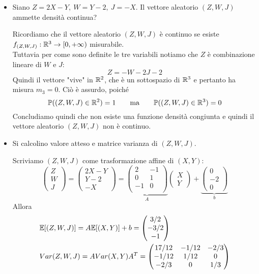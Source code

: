 \begin{itemize}
\item [(d)] Siano $Z=2X-Y,\ W=Y-2,\ J=-X$. Il vettore aleatorio $(Z,W,J)$ ammette densità continua?

Ricordiamo che il vettore aleatorio $(Z,W,J)$ è continuo se esiste $f_{(Z,W,J)}:\mathbb{R}^3\to[0,+\infty)$ misurabile. \\
Tuttavia per come sono definite le tre variabili notiamo che $Z$ è combinazione lineare di $W$ e $J$:
\[
Z=-W-2J-2
\]
Quindi il vettore "vive" in $\mathbb{R}^2$, che è un sottospazio di $\mathbb{R}^3$ e pertanto ha misura $m_3=0$. Ciò è assurdo, poiché
\[
\mathbb{P}((Z,W,J)\in\mathbb{R}^2)=1\qquad\text{ma}\qquad\mathbb{P}((Z,W,J)\in\mathbb{R}^3)=0
\]
Concludiamo quindi che non esiste una funzione densità congiunta e quindi il vettore aleatorio $(Z,W,J)$ non è continuo.

\item [(e)] Si calcolino valore atteso e matrice varianza di $(Z,W,J)$.

Scriviamo $(Z,W,J)$ come trasformazione affine di $(X,Y)$:
\[
\begin{pmatrix}
Z \\
W \\ J
\end{pmatrix}=
\begin{pmatrix}
2X-Y \\Y-2
 \\-X
\end{pmatrix} =\underbrace{\begin{pmatrix}
2 & -1 \\
 0&1  \\
 -1&0  \\
\end{pmatrix}}_{A}\begin{pmatrix}
X \\
Y
\end{pmatrix}+\underbrace{\begin{pmatrix}
0 \\
-2 \\ 0
\end{pmatrix}}_{b}
\]
Allora
\begin{gather*}
\begin{aligned}
&\mathbb{E}[(Z,W,J)]=A\mathbb{E}[(X,Y)]+b=\begin{pmatrix} 3/2 \\ -3/2  \\-1 \end{pmatrix}   \\
&Var(Z,W,J)=AVar(X,Y)A^T=\begin{pmatrix}
17/12 & -1/12 & -2/3 \\
-1/12 &  1/12& 0 \\
 -2/3& 0 & 1/3 \\
\end{pmatrix}
\end{aligned}
\end{gather*}


\end{itemize}
